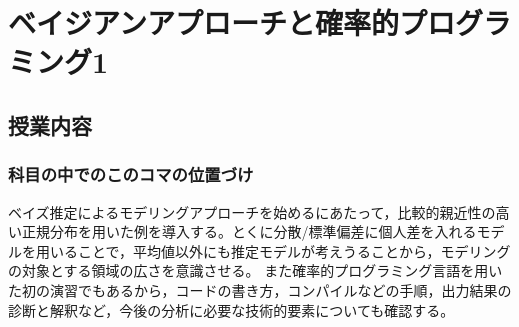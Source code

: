 \section{ベイジアンアプローチと確率的プログラミング1}
\subsection{授業内容}
\subsubsection{科目の中でのこのコマの位置づけ}
ベイズ推定によるモデリングアプローチを始めるにあたって，比較的親近性の高い正規分布を用いた例を導入する。とくに分散/標準偏差に個人差を入れるモデルを用いることで，平均値以外にも推定モデルが考えうることから，モデリングの対象とする領域の広さを意識させる。
また確率的プログラミング言語を用いた初の演習でもあるから，コードの書き方，コンパイルなどの手順，出力結果の診断と解釈など，今後の分析に必要な技術的要素についても確認する。

